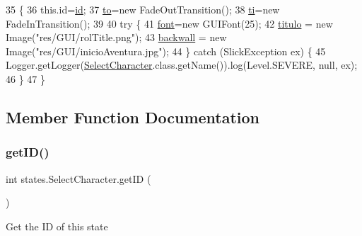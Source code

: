 \begin{DoxyCode}
35                                   \{
36         this.\textcolor{keywordtype}{id}=\mbox{\hyperlink{classstates_1_1_select_character_a5c1f6e40502826b9d1b8ece9e66f08a5}{id}};
37         \mbox{\hyperlink{classstates_1_1_select_character_a68834105cf56b725541f4fb94ca14d31}{to}}=\textcolor{keyword}{new} FadeOutTransition();
38         \mbox{\hyperlink{classstates_1_1_select_character_af8f40fad4e926ebbb979340c12ecb326}{ti}}=\textcolor{keyword}{new} FadeInTransition();
39         
40         \textcolor{keywordflow}{try} \{
41             \mbox{\hyperlink{classstates_1_1_select_character_aacd9a8008cf64ff8e04eb05d0af88ce7}{font}}=\textcolor{keyword}{new} GUIFont(25);
42             \mbox{\hyperlink{classstates_1_1_select_character_a08562d62626aed4d70fdd3df76f3bf0e}{titulo}} = \textcolor{keyword}{new} Image(\textcolor{stringliteral}{"res/GUI/rolTitle.png"});
43             \mbox{\hyperlink{classstates_1_1_select_character_ad3efe515775d6b2f543ff024b73c0db8}{backwall}} = \textcolor{keyword}{new} Image(\textcolor{stringliteral}{"res/GUI/inicioAventura.jpg"});
44         \} \textcolor{keywordflow}{catch} (SlickException ex) \{
45             Logger.getLogger(\mbox{\hyperlink{classstates_1_1_select_character_a9062e830d534afc91e4f79940aed82b9}{SelectCharacter}}.class.getName()).log(Level.SEVERE, null, ex);
46         \}
47     \}
\end{DoxyCode}


\subsection{Member Function Documentation}
\mbox{\label{classstates_1_1_select_character_a06b40374019fef5b3f3f88be6a3a8686}} 
\subsubsection{\texorpdfstring{get\+I\+D()}{getID()}}
{\footnotesize\ttfamily int states.\+Select\+Character.\+get\+ID (\begin{DoxyParamCaption}{ }\end{DoxyParamCaption})\hspace{0.3cm}{\ttfamily [inline]}}

Get the ID of this state

